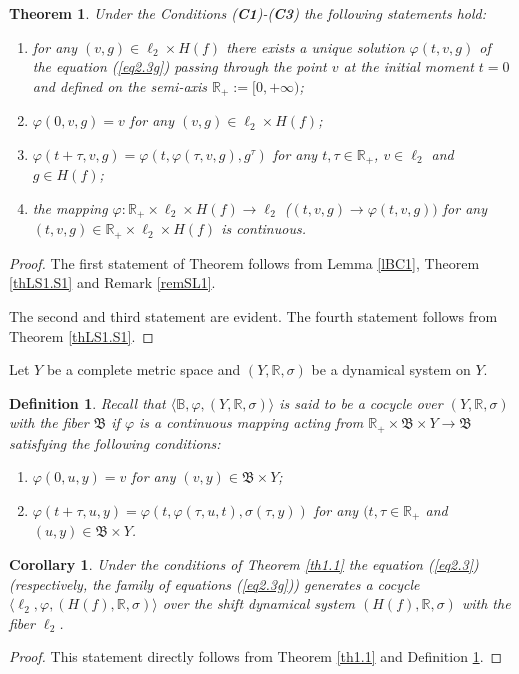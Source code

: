 \documentclass{amsart}%
\newtheorem{theorem}[lemma]{Theorem}
\newtheorem{coro}[lemma]{Corollary}
\newtheorem{definition}[lemma]{Definition}
\begin{document}
\begin{theorem} Under the Conditions (\textbf{C1})-(\textbf{C3}) the following statements hold:
\begin{enumerate}
    \item for any $(v,g)\in \ell_{2}\times H(f)$ there exists a unique
    solution $\varphi(t,v,g)$ of the equation (\ref{eq2.3g}) passing
    through the point $v$ at the initial moment $t=0$ and defined on
    the semi-axis $\mathbb R_{+}:=[0,+\infty)$; \item
    $\varphi(0,v,g)=v$ for any $(v,g)\in \ell_{2}\times H(f)$; \item
    $\varphi(t+\tau,v,g)=\varphi(t,\varphi(\tau,v,g),g^{\tau})$ for
    any $t,\tau\in \mathbb R_{+}$, $v\in \ell_{2}$ and $g\in H(f)$;
     \item the mapping
    $\varphi :\mathbb R_{+}\times \ell_{2}\times H(f)\to \ell_{2}$
    ($(t,v,g)\to \varphi(t,v,g))$ for any $(t,v,g)\in \mathbb
    R_{+}\times \ell_{2}\times H(f)$ is continuous.
\end{enumerate}
\end{theorem}
\begin{proof}
The first statement of Theorem follows from Lemma \ref{lBC1},
Theorem \ref{thLS1.S1} and Remark \ref{remSL1}.

The second and third statement are evident. The fourth statement
follows from Theorem \ref{thLS1.S1}.
\end{proof}

Let $Y$ be a complete metric space and $(Y,\mathbb R,\sigma)$ be a
dynamical system on $Y$.

\begin{definition}\label{defC1} Recall \cite[Ch.I]{Che_2015} that
$\langle \mathbb B,\varphi, (Y,\mathbb R,\sigma)\rangle$ is said
to be a cocycle over $(Y,\mathbb R,\sigma)$ with the fiber
$\mathfrak B$ if $\varphi$ is a continuous mapping acting from
$\mathbb R_{+}\times \mathfrak B\times Y\to \mathfrak B$
satisfying the following conditions:
\begin{enumerate}
\item $\varphi(0,u,y)=v$ for any $(v,y)\in \mathfrak B\times Y$;
\item
$\varphi(t+\tau,u,y)=\varphi(t,\varphi(\tau,u,t),\sigma(\tau,y))$
for any $(t,\tau \in \mathbb R_{+}$ and $(u,y)\in \mathfrak
B\times Y$.
\end{enumerate}
\end{definition}

\begin{coro}\label{corH1}
Under the conditions of Theorem \ref{th1.1} the equation
(\ref{eq2.3}) (respectively, the family of equations
(\ref{eq2.3g})) generates a cocycle $\langle
\ell_{2},\varphi,(H(f),\mathbb R,\sigma)\rangle$ over the shift
dynamical system $(H(f),\mathbb R,\sigma)$ with the fiber
$\ell_{2}$.
\end{coro}
\begin{proof} This statement directly follows from Theorem
\ref{th1.1} and Definition \ref{defC1}.
\end{proof}
\end{document}
